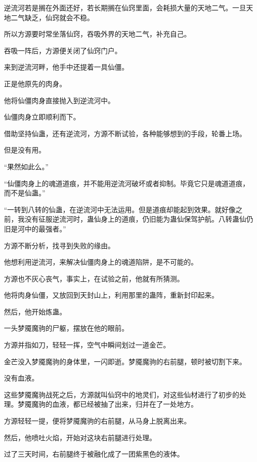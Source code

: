
\begin{this_body}



逆流河若是搁在外面还好，若长期搁在仙窍里面，会耗损大量的天地二气。一旦天地二气缺乏，仙窍就会不稳。

所以方源要时常坐落仙窍，吞吸外界的天地二气，补充自己。

吞吸一阵后，方源便关闭了仙窍门户。

来到逆流河畔，他手中还提着一具仙僵。

正是他原先的肉身。

他将仙僵肉身直接抛入到逆流河中。

仙僵肉身立即顺利而下。

借助坚持仙蛊，还有逆流河，方源不断试验，各种能够想到的手段，轮番上场。

但是没有用。

“果然如此么。”

“仙僵肉身上的魂道道痕，并不能用逆流河破坏或者抑制。毕竟它只是魂道道痕，而不是仙蛊。”

“一转到八转的仙蛊，在逆流河中无法运用。但是道痕却能起到效果。就好像之前，我没有征服逆流河时，蛊仙身上的道痕，仍旧能为蛊仙保驾护航。八转蛊仙仍旧是河中的最强者。”

方源不断分析，找寻到失败的缘由。

他想利用逆流河，来解决仙僵肉身上的魂道陷阱，是不可能的。

方源也不灰心丧气，事实上，在试验之前，他就有所猜测。

他将肉身仙僵，又放回到天封山上，利用那里的蛊阵，重新封印起来。

然后，他开始炼蛊。

一头梦魇魔驹的尸躯，摆放在他的眼前。

方源并指如刀，轻轻一挥，空气中瞬间划过一道金芒。

金芒没入梦魇魔驹的身体里，一闪即逝。梦魇魔驹的右前腿，顿时被切割下来。

没有血液。

这些梦魇魔驹战死之后，方源就叫仙窍中的地灵们，对这些仙材进行了初步的处理。梦魇魔驹的血液，都已经被抽了出来，归并在了一处地方。

方源轻轻一提，便将梦魇魔驹的右前腿，从马身上脱离出来。

然后，他喷吐火焰，开始对这块右前腿进行处理。

过了三天时间，右前腿终于被融化成了一团紫黑色的液体。


\end{this_body}
